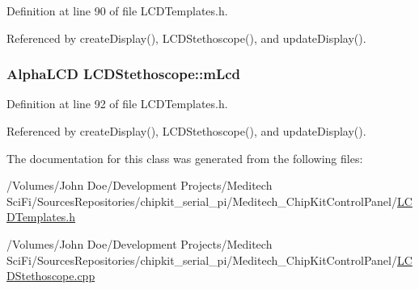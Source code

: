 Definition at line 90 of file L\-C\-D\-Templates.\-h.



Referenced by create\-Display(), L\-C\-D\-Stethoscope(), and update\-Display().

\hypertarget{class_l_c_d_stethoscope_af91304920f29b700ae27aee8aba23ac1}{
\subsubsection[{m\-Lcd}]{\setlength{\rightskip}{0pt plus 5cm}Alpha\-L\-C\-D L\-C\-D\-Stethoscope\-::m\-Lcd\hspace{0.3cm}{\ttfamily [private]}}}\label{class_l_c_d_stethoscope_af91304920f29b700ae27aee8aba23ac1}


Definition at line 92 of file L\-C\-D\-Templates.\-h.



Referenced by create\-Display(), L\-C\-D\-Stethoscope(), and update\-Display().



The documentation for this class was generated from the following files\-:\begin{DoxyCompactItemize}
\item 
/\-Volumes/\-John Doe/\-Development Projects/\-Meditech Sci\-Fi/\-Sources\-Repositories/chipkit\-\_\-serial\-\_\-pi/\-Meditech\-\_\-\-Chip\-Kit\-Control\-Panel/\hyperlink{_l_c_d_templates_8h}{L\-C\-D\-Templates.\-h}\item 
/\-Volumes/\-John Doe/\-Development Projects/\-Meditech Sci\-Fi/\-Sources\-Repositories/chipkit\-\_\-serial\-\_\-pi/\-Meditech\-\_\-\-Chip\-Kit\-Control\-Panel/\hyperlink{_l_c_d_stethoscope_8cpp}{L\-C\-D\-Stethoscope.\-cpp}\end{DoxyCompactItemize}
